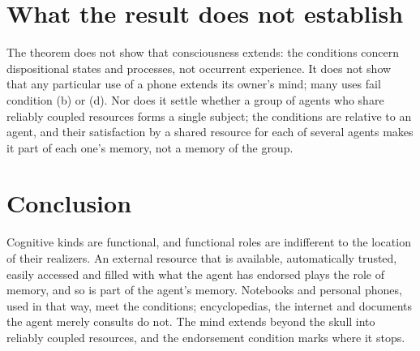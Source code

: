 \documentclass{situationist-preprint}
\begin{document}
\section{What the result does not establish}

The theorem does not show that consciousness extends: the conditions concern dispositional states and processes, not occurrent experience. It does not show that any particular use of a phone extends its owner's mind; many uses fail condition (b) or (d). Nor does it settle whether a group of agents who share reliably coupled resources forms a single subject; the conditions are relative to an agent, and their satisfaction by a shared resource for each of several agents makes it part of each one's memory, not a memory of the group.

\section{Conclusion}

Cognitive kinds are functional, and functional roles are indifferent to the location of their realizers. An external resource that is available, automatically trusted, easily accessed and filled with what the agent has endorsed plays the role of memory, and so is part of the agent's memory. Notebooks and personal phones, used in that way, meet the conditions; encyclopedias, the internet and documents the agent merely consults do not. The mind extends beyond the skull into reliably coupled resources, and the endorsement condition marks where it stops.
\end{document}
